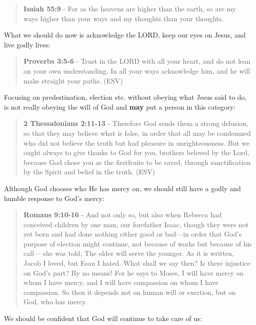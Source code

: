 \documentclass[11pt]{article}
\begin{document}
\begin{quote}
\textbf{Isaiah 55:9} - For as the heavens are higher than the earth, so are my ways higher than your ways and my thoughts than your thoughts.
\end{quote}

What we should do now is acknowledge the LORD, keep our eyes on Jesus, and live godly lives:

\begin{quote}
\textbf{Proverbs 3:5-6} - Trust in the LORD with all your heart, and do not lean on your own understanding. In all your ways acknowledge him, and he will make straight your paths. (ESV)
\end{quote}

Focusing on predestination, election etc. without obeying what Jesus said to do, is not really obeying the will of God and \textbf{may} put a person in this category:

\begin{quote}
\textbf{2 Thessalonians 2:11-13} - Therefore God sends them a strong delusion, so that they may believe what is false, in order that all may be condemned who did not believe the truth but had pleasure in unrighteousness.  But we ought always to give thanks to God for you, brothers beloved by the Lord, because God chose you as the firstfruits to be saved, through sanctification by the Spirit and belief in the truth.  (ESV)
\end{quote}

Although God chooses who He has mercy on, we should still have a godly and humble response to God's mercy:

\begin{quote}
\textbf{Romans 9:10-16} - And not only so, but also when Rebecca had conceived children by one man, our forefather Isaac, though they were not yet born and had done nothing either good or bad—in order that God's purpose of election might continue, not because of works but because of his call— she was told, The older will serve the younger. As it is written, Jacob I loved, but Esau I hated. What shall we say then? Is there injustice on God's part? By no means! For he says to Moses, I will have mercy on whom I have mercy, and I will have compassion on whom I have compassion. So then it depends not on human will or exertion, but on God, who has mercy.
\end{quote}

We should be confident that God will continue to take care of us:
\end{document}
